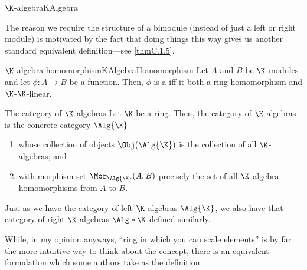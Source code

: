 \begin{dfn}{$\K$-algebra}{KAlgebra}
\begin{rmk}
	\end{rmk}
	\begin{rmk}
		The reason we require the structure of a bimodule (instead of just a left or right module) is motivated by the fact that doing things this way gives us another standard equivalent definition---see \cref{thmC.1.5}.
	\end{rmk}
\end{dfn}
\begin{dfn}{$\K$-algebra homomorphism}{KAlgebraHomomorphism}
	Let $A$ and $B$ be $\K$-modules and let $\phi \colon A\rightarrow B$ be a function.  Then, $\phi$ is a  iff it both a ring homomorphism and $\K$-$\K$-linear.
\end{dfn}
\begin{exm}{The category of $\K$-algebras}{}
	Let $\K$ be a ring.  Then, the category of $\K$-algebras is the concrete category $\Alg{\K}$\index[notation]{$\Alg{\K}$}
	\begin{enumerate}
		\item whose collection of objects $\Obj (\Alg{\K})$ is the collection of all $\K$-algebras; and
		\item with morphism set $\Mor _{\Alg{\K}}(A,B)$ precisely the set of all $\K$-algebra homomorphisms from $A$ to $B$.
	\end{enumerate}
	\begin{rmk}
		Just as we have the category of left $\K$-algebras $\Alg{\K}$, we also have that category of right $\K$-algebras $\Alg*{\K}$\index[notation]{$\Alg*{\K}$} defined similarly.
	\end{rmk}
\end{exm}
While, in my opinion anyways, ``ring in which you can scale elements'' is by far the more intuitive way to think about the concept, there is an equivalent formulation which some authors take as the definition.
